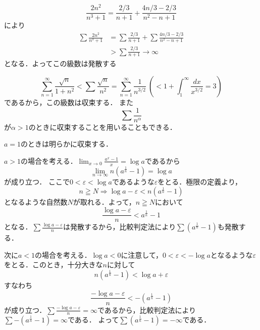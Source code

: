 


\begin{tanswer}
    \[
        \frac{2n^2}{n^3+1}=\frac{2/3}{n+1}+\frac{4n/3-2/3}{n^2-n+1}
    \]
    により
    \begin{align*}
        \sum \frac{2n^2}{n^3+1} & =\sum \frac{2/3}{n+1}+\sum \frac{4n/3-2/3}{n^2-n+1} \\
                                & >\sum \frac{2/3}{n+1} \rightarrow \infty
    \end{align*}
    となる．よってこの級数は発散する
\end{tanswer}



\begin{tanswer}
    \[
        \sum ^{\infty}_{n=1}\frac{\sqrt{n}}{1+n^2}<\sum \frac{\sqrt{n}}{n^2}=\sum^{\infty}_{n=1}\frac{1}{n^{3/2}}~\left(<1+\int^{\infty}_{1}\frac{dx}{x^{3/2}}=3\right)
    \]
    であるから，この級数は収束する．
    また
    \[
        \sum \frac{1}{n^\alpha}
    \]
    が$\alpha >1$のときに収束することを用いることもできる．
\end{tanswer}



\begin{tanswer}
    $a=1$のときは明らかに収束する．

    $a>1$の場合を考える．$\lim_{x \to 0} \frac{a^x-1}{x} = \log a$であるから
    \[
        \lim_{n \to \infty} n(a^{\frac{1}{n}}-1) = \log a
    \]
    が成り立つ．
    ここで$0 < \varepsilon <\log a$であるような$\varepsilon$をとる．極限の定義より，
    \[
        n \geqq N \Longrightarrow \log a - \varepsilon < n (a^\frac{1}{n}-1)
    \]
    となるような自然数$N$が取れる．よって，$n \geqq N$において
    \[
        \frac{\log a - \varepsilon}{n} < a^\frac{1}{n}-1
    \]
    となる．$\sum \frac{\log a - \varepsilon}{n}$は発散するから，比較判定法により$\sum (a^{\frac{1}{n}}-1)$も発散する．

    次に$ a<1$の場合を考える．$\log a <0$に注意して，$0 < \varepsilon <-\log a $となるような$\varepsilon$をとる．このとき，十分大きな$n$に対して
    \[
        n (a^\frac{1}{n}-1) < \log a + \varepsilon
    \]
    すなわち
    \[
        \frac{-\log a - \varepsilon}{n} < -(a^\frac{1}{n}-1)
    \]
    が成り立つ．$\sum \frac{-\log a - \varepsilon}{n}=\infty$であるから，比較判定法により$\sum -(a^{\frac{1}{n}}-1)=\infty$である．
    よって$\sum (a^{\frac{1}{n}}-1)=-\infty$である．
\end{tanswer}


